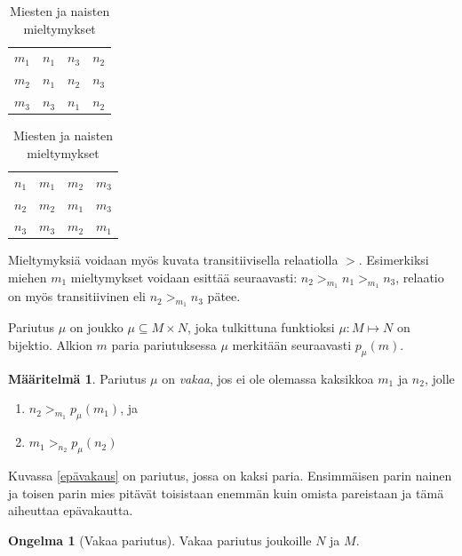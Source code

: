 \documentclass[finnish]{tktltiki2}
\theoremstyle{definition}
\newtheorem{maar}[lau]{Määritelmä}
\newtheorem{ong}{Ongelma}
\theoremstyle{remark}
\begin{document}
\begin{table}[t]
\centering
	\begin{tabular}{ l | *{2}{c} r }
	 &  \\
	 \hline
 	 $m_{1}$ & $n_{1}$ & $n_{3}$ & $n_{2}$ \\
 	 $m_{2}$ & $n_{1}$ & $n_{2}$ & $n_{3}$ \\
 	 $m_{3}$ & $n_{3}$ & $n_{1}$ & $n_{2}$ \\
	\end{tabular}
	\quad
	\begin{tabular}{ l | *{2}{c} r }
	 &  \\
	 \hline
 	 $n_{1}$ & $m_{1}$ & $m_{2}$ & $m_{3}$ \\
 	 $n_{2}$ & $m_{2}$ & $m_{1}$ & $m_{3}$ \\
 	 $n_{3}$ & $m_{3}$ & $m_{2}$ & $m_{1}$ \\
	\end{tabular}
	\caption{Miesten ja naisten mieltymykset}
	\label{mieltymyksettaul}
\end{table}

Mieltymyksiä voidaan myös kuvata transitiivisella relaatiolla $>$. Esimerkiksi miehen $m_1$ mieltymykset voidaan esittää seuraavasti: $n_2 >_{m_1} n_1 >_{m_1} n_3$, relaatio on myös transitiivinen eli $n_2 >_{m_1} n_3$ pätee.

Pariutus $\mu$ on joukko $\mu \subseteq M \times N$, joka tulkittuna funktioksi $\mu : M \mapsto N$ on bijektio. Alkion $m$ paria pariutuksessa $\mu$ merkitään seuraavasti $p_{\mu}(m)$.

\begin{maar}
Pariutus $\mu$ on \emph{vakaa}, jos ei ole olemassa kaksikkoa $m_1$ ja  $n_2$, jolle
\begin{enumerate}
	\item $n_2 >_{m_{1}} p_{\mu}(m_1)$, ja
	\item $m_1 >_{n_{2}} p_{\mu}(n_2)$
\end{enumerate}


Kuvassa \ref{epävakaus} on pariutus, jossa on kaksi paria. Ensimmäisen parin nainen ja toisen parin mies pitävät toisistaan enemmän kuin omista pareistaan ja tämä aiheuttaa epävakautta.

\begin{ong}[Vakaa pariutus]
Vakaa pariutus joukoille $N$ ja $M$.
\end{ong}
\end{maar}
\end{document}
